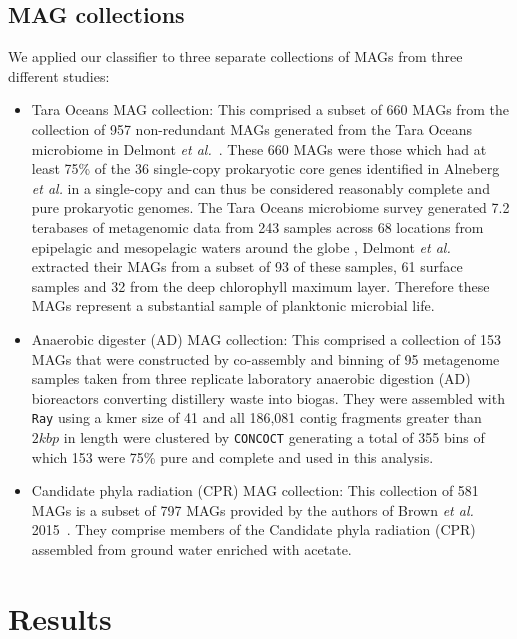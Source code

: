 \documentclass[10pt,letterpaper]{article}
\begin{document}
\subsection*{MAG collections}
We applied our classifier to three separate collections of MAGs from three different studies:
\begin{itemize}

\item Tara Oceans MAG collection: This comprised a subset of 660 MAGs from the collection 
of 957 non-redundant MAGs generated from the Tara Oceans microbiome in Delmont {\it et al.}~\cite{Delmont2017}. These 660 MAGs were those which had at least 75\% of the 36 single-copy prokaryotic core genes identified in Alneberg {\it et al.} \cite{Alneberg2014} in a single-copy and can thus be considered reasonably complete and pure prokaryotic genomes. The Tara Oceans microbiome survey generated 7.2 terabases of metagenomic data from 243 samples across 68 locations from epipelagic and mesopelagic waters around the globe \cite{Sunagawa2015}, Delmont {\it et al.} extracted their MAGs from a subset of 93 of these samples, 61 surface samples and 32 from the deep chlorophyll maximum layer. Therefore these MAGs represent a substantial sample of planktonic microbial life.

\item Anaerobic digester (AD) MAG collection: This comprised a collection of 153 MAGs that were constructed by co-assembly and binning of 95 metagenome samples taken from three 
replicate laboratory anaerobic digestion (AD) bioreactors converting distillery waste into biogas. They were assembled with \texttt{Ray} using a kmer size of 41 and all 186,081 contig fragments greater than $2 kbp$ in length were clustered by \texttt{CONCOCT} \cite{Alneberg2014} generating a total of 355 bins of which 153 were 75\% pure and complete and used in this analysis. 

\item Candidate phyla radiation (CPR) MAG collection: This collection of 581 MAGs is a subset of 797 MAGs provided by the authors of Brown \emph{et al.} 2015~\cite{Brown2015}. They comprise members 
of the Candidate phyla radiation (CPR) assembled from ground water enriched with acetate.

\end{itemize} 

\section*{Results}
\end{document}
